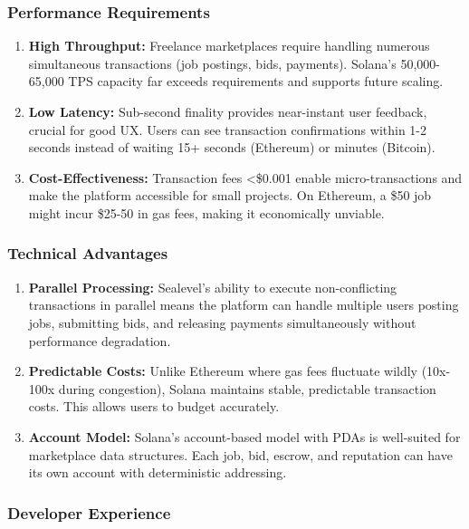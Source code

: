 \documentclass[a4paper,13pt,twoside]{report}
\theoremstyle{definition}
\begin{document}
\subsubsection{Performance Requirements}

\begin{enumerate}
    \item \textbf{High Throughput:} Freelance marketplaces require handling numerous simultaneous transactions (job postings, bids, payments). Solana's 50,000-65,000 TPS capacity far exceeds requirements and supports future scaling.

    \item \textbf{Low Latency:} Sub-second finality provides near-instant user feedback, crucial for good UX. Users can see transaction confirmations within 1-2 seconds instead of waiting 15+ seconds (Ethereum) or minutes (Bitcoin).

    \item \textbf{Cost-Effectiveness:} Transaction fees <\$0.001 enable micro-transactions and make the platform accessible for small projects. On Ethereum, a \$50 job might incur \$25-50 in gas fees, making it economically unviable.
\end{enumerate}

\subsubsection{Technical Advantages}

\begin{enumerate}
    \item \textbf{Parallel Processing:} Sealevel's ability to execute non-conflicting transactions in parallel means the platform can handle multiple users posting jobs, submitting bids, and releasing payments simultaneously without performance degradation.

    \item \textbf{Predictable Costs:} Unlike Ethereum where gas fees fluctuate wildly (10x-100x during congestion), Solana maintains stable, predictable transaction costs. This allows users to budget accurately.

    \item \textbf{Account Model:} Solana's account-based model with PDAs is well-suited for marketplace data structures. Each job, bid, escrow, and reputation can have its own account with deterministic addressing.
\end{enumerate}

\subsubsection{Developer Experience}
\end{document}
